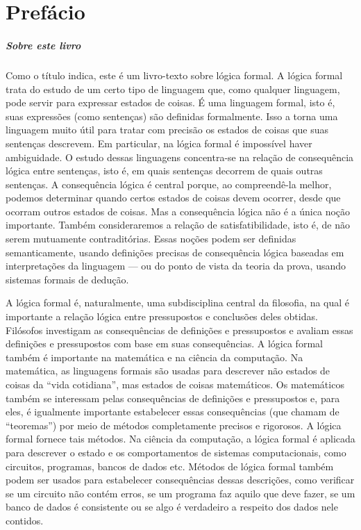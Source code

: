 \chapter{Prefácio}\label{preface}

\paragraph{Sobre este livro}

Como o título indica, este é um livro-texto sobre lógica formal. A lógica formal trata do estudo de um certo tipo de linguagem que, como qualquer linguagem, pode servir para expressar estados de coisas. É uma linguagem formal, isto é, suas expressões (como sentenças) são definidas formalmente. Isso a torna uma linguagem muito útil para tratar com precisão os estados de coisas que suas sentenças descrevem. Em particular, na lógica formal é impossível haver ambiguidade. O estudo dessas linguagens concentra-se na relação de consequência lógica entre sentenças, isto é, em quais sentenças decorrem de quais outras sentenças. A consequência lógica é central porque, ao compreendê-la melhor, podemos determinar quando certos estados de coisas devem ocorrer, desde que ocorram outros estados de coisas. Mas a consequência lógica não é a única noção importante. Também consideraremos a relação de satisfatibilidade, isto é, de não serem mutuamente contraditórias. Essas noções podem ser definidas semanticamente, usando definições precisas de consequência lógica baseadas em interpretações da linguagem — ou do ponto de vista da teoria da prova, usando sistemas formais de dedução.

A lógica formal é, naturalmente, uma subdisciplina central da filosofia, na qual é importante a relação lógica entre pressupostos e conclusões deles obtidas. Filósofos investigam as consequências de definições e pressupostos e avaliam essas definições e pressupostos com base em suas consequências. A lógica formal também é importante na matemática e na ciência da computação. Na matemática, as linguagens formais são usadas para descrever não estados de coisas da \textquotedblleft vida cotidiana\textquotedblright, mas estados de coisas matemáticos. Os matemáticos também se interessam pelas consequências de definições e pressupostos e, para eles, é igualmente importante estabelecer essas consequências (que chamam de \textquotedblleft teoremas\textquotedblright) por meio de métodos completamente precisos e rigorosos. A lógica formal fornece tais métodos. Na ciência da computação, a lógica formal é aplicada para descrever o estado e os comportamentos de sistemas computacionais, como circuitos, programas, bancos de dados etc. Métodos de lógica formal também podem ser usados para estabelecer consequências dessas descrições, como verificar se um circuito não contém erros, se um programa faz aquilo que deve fazer, se um banco de dados é consistente ou se algo é verdadeiro a respeito dos dados nele contidos.

